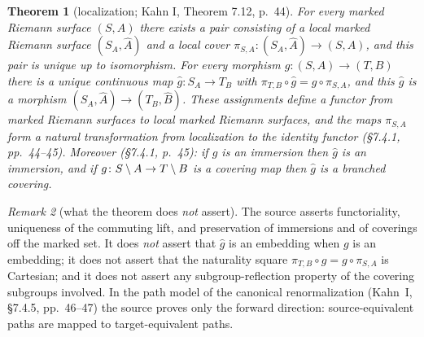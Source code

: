 \documentclass[11pt,reqno]{amsart}
\newtheorem{theorem}{Theorem}[section]
\theoremstyle{definition}
\theoremstyle{remark}
\newtheorem{remark}[theorem]{Remark}
\begin{document}
\begin{theorem}[localization; Kahn I, Theorem 7.12, p.~44]\label{thm:kahn-localization}
For every marked Riemann surface \((S,A)\) there exists a pair
consisting of a local marked Riemann surface \((S_A,\widehat A)\) and
a local cover \(\pi_{S,A}\colon(S_A,\widehat A)\to(S,A)\), and this
pair is unique up to isomorphism.  For every morphism
\(g\colon(S,A)\to(T,B)\) there is a unique continuous map
\(\widehat g\colon S_A\to T_B\) with
\(\pi_{T,B}\circ\widehat g=g\circ\pi_{S,A}\), and this \(\widehat g\)
is a morphism \((S_A,\widehat A)\to(T_B,\widehat B)\).  These
assignments define a functor from marked Riemann surfaces to local
marked Riemann surfaces, and the maps \(\pi_{S,A}\) form a natural
transformation from localization to the identity functor
(\S7.4.1, pp.~44--45).  Moreover (\S7.4.1, p.~45): if \(g\) is an immersion
then \(\widehat g\) is an immersion, and if
\(g\colon S\setminus A\to T\setminus B\) is a covering map then \(\widehat g\) is
a branched covering.
\end{theorem}

\begin{remark}[what the theorem does \emph{not} assert]\label{rem:localization-nonassertions}
The source asserts functoriality, uniqueness of the commuting lift,
and preservation of immersions and of coverings off the marked set.
It does \emph{not} assert that \(\widehat g\) is an embedding when
\(g\) is an embedding; it does not assert that the naturality square
\(\pi_{T,B}\circ\widehat g=g\circ\pi_{S,A}\) is Cartesian; and it does
not assert any subgroup-reflection property of the covering subgroups
involved.  In the path model of the canonical renormalization
(Kahn~I, \S7.4.5, pp.~46--47) the source proves only the forward
direction: source-equivalent paths are mapped to target-equivalent
paths.
\end{remark}
\end{document}
